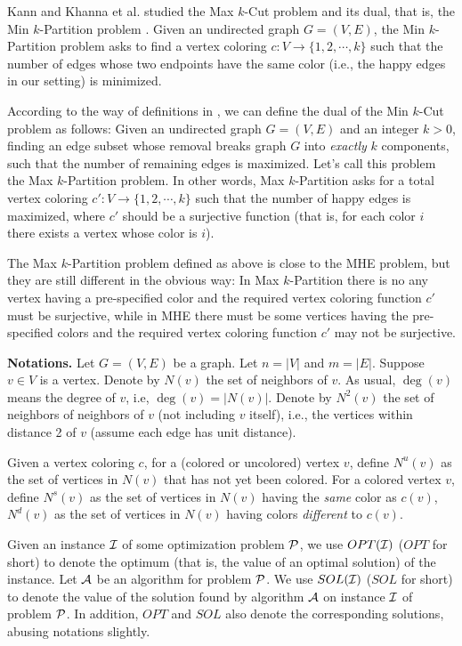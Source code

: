 \documentclass[11pt]{article}
\begin{document}
Kann and Khanna et al. \cite{KKL+97} studied the Max $k$-Cut problem \cite{FJ97}
and its dual, that is, the Min $k$-Partition problem \cite{KKL+97}.
Given an undirected graph $G = (V, E)$, the Min $k$-Partition problem asks
to find a vertex coloring $c \colon V \rightarrow \{1, 2, \cdots, k\}$
such that the number of edges whose two endpoints have the same color
(i.e., the happy edges in our setting) is minimized.

According to the way of definitions in \cite{KKL+97}, we can define
the dual of the Min $k$-Cut problem \cite{SV95} as follows:
Given an undirected graph $G = (V, E)$ and an integer $k > 0$,
finding an edge subset whose removal breaks graph $G$ into {\em exactly}
$k$ components, such that the number of remaining edges is maximized.
Let's call this problem the Max $k$-Partition problem.
In other words, Max $k$-Partition asks for a total vertex coloring
$c' \colon V \rightarrow \{1, 2, \cdots, k\}$ such that the number of
happy edges is maximized, where $c'$ should be a surjective function
(that is, for each color $i$ there exists a vertex whose color is $i$).

The Max $k$-Partition problem defined as above is close to the MHE problem,
but they are still different in the obvious way:
In Max $k$-Partition there is no any vertex having a pre-specified
color and the required vertex coloring function $c'$ must be surjective,
while in MHE there must be some vertices having the pre-specified colors
and the required vertex coloring function $c'$ may not be surjective.




\bigskip
{\bf Notations.}
Let $G = (V, E)$ be a graph. Let $n = |V|$ and $m = |E|$.
Suppose $v \in V$ is a vertex. Denote by $N(v)$ the set of neighbors of $v$.
As usual, $\deg(v)$ means the degree of $v$, i.e, $\deg(v) = |N(v)|$.
Denote by $N^2(v)$ the set of neighbors of neighbors of $v$ (not including
$v$ itself), i.e., the vertices within distance 2 of $v$ (assume each edge
has unit distance).

Given a vertex coloring $c$, for a (colored or uncolored) vertex $v$, define
$N^u(v)$ as the set of vertices in $N(v)$ that has not yet been colored.
For a colored vertex $v$, define $N^s(v)$ as the set of vertices in $N(v)$
having the {\em same} color as $c(v)$, $N^d(v)$ as the set of vertices in
$N(v)$ having colors {\em different} to $c(v)$.

Given an instance $\cal I$ of some optimization problem $\cal P$,
we use $OPT({\cal I})$ ($OPT$ for short) to denote the optimum (that is,
the value of an optimal solution) of the instance.
Let $\cal A$ be an algorithm for problem $\cal P$.
We use $SOL({\cal I})$ ($SOL$ for short) to denote the value of the solution
found by algorithm $\cal A$ on instance $\cal I$ of problem $\cal P$.
In addition, $OPT$ and $SOL$ also denote the corresponding solutions,
abusing notations slightly.
\end{document}
